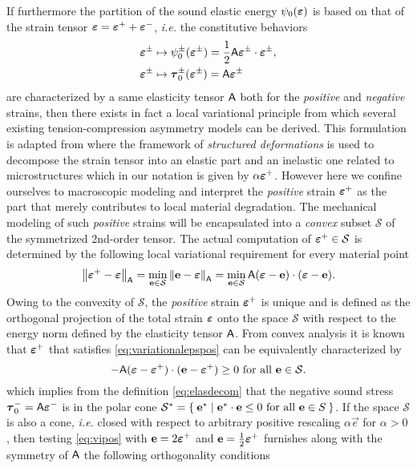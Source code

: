 If furthermore the partition of the sound elastic energy $\psi_0(\eps)$ is based on that of the strain tensor $\eps=\eps^++\eps^-$, \emph{i.e.} the constitutive behaviors
\begin{equation} \label{eq:elasdecom}
\begin{aligned}
\eps^\pm &\mapsto \psi_0^\pm(\eps^\pm)=\frac{1}{2}\tens{A}\eps^\pm\cdot\eps^\pm, \\
\eps^\pm &\mapsto \vtau_0^\pm(\eps^\pm)=\tens{A}\eps^\pm
\end{aligned}
\end{equation}
are characterized by a same elasticity tensor $\mathsf{A}$ both for the \emph{positive} and \emph{negative} strains, then there exists in fact a local variational principle from which several existing tension-compression asymmetry models can be derived. This formulation is adapted from \cite{FreddiRoyer-Carfagni:2010} where the framework of \emph{structured deformations} is used to decompose the strain tensor into an elastic part and an inelastic one related to microstructures which in our notation is given by $\alpha\eps^+$. However here we confine ourselves to macroscopic modeling and interpret the \emph{positive} strain $\eps^+$ as the part that merely contributes to local material degradation. The mechanical modeling of such \emph{positive} strains will be encapsulated into a \emph{convex} subset $\mathcal{S}$ of the symmetrized 2nd-order tensor. The actual computation of $\eps^+\in\mathcal{S}$ is determined by the following local variational requirement for every material point
\begin{equation} \label{eq:variationalepspos}
\norm{\eps^+-\eps}_\tens{A}=\min_{\vec{e}\in\mathcal{S}}\norm{\vec{e}-\eps}_\tens{A}=\min_{\vec{e}\in\mathcal{S}}\tens{A}(\eps-\vec{e})\cdot(\eps-\vec{e}).
\end{equation}
Owing to the convexity of $\mathcal{S}$, the \emph{positive} strain $\eps^+$ is unique and is defined as the orthogonal projection of the total strain $\eps$ onto the space $\mathcal{S}$ with respect to the energy norm defined by the elasticity tensor $\mathsf{A}$. From convex analysis it is known that $\eps^+$ that satisfies \eqref{eq:variationalepspos} can be equivalently characterized by
\begin{equation} \label{eq:vipos}
-\tens{A}(\eps-\eps^+)\cdot(\vec{e}-\eps^+)\geq0\text{ for all $\vec{e}\in\mathcal{S}$}.
\end{equation}
which implies from the definition \eqref{eq:elasdecom} that the negative sound stress $\vtau_0^-=\tens{A}\eps^-$ is in the polar cone $\mathcal{S}^*=\set{\vec{e}^*|\vec{e}^*\cdot\vec{e}\leq 0\text{ for all $\vec{e}\in S$}}$. If the space $\mathcal{S}$ is also a cone, \emph{i.e.} closed with respect to arbitrary positive rescaling $\alpha\vec{e}$ for $\alpha>0$, then testing \eqref{eq:vipos} with $\vec{e}=2\eps^+$ and $\vec{e}=\frac{1}{2}\eps^+$ furnishes along with the symmetry of $\mathsf{A}$ the following orthogonality conditions
